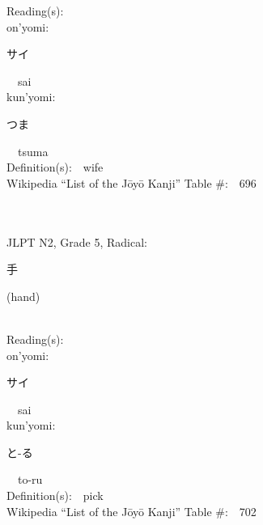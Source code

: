 \begin{multicols}{2}
Reading(s):\ \ \\
{\hspace*{1em}}on'yomi:\ \ \\
{\hspace*{2em}}{\begin{CJK}{UTF8}{min} サイ \end{CJK}}\ \ sai\ \ \\
{\hspace*{1em}}kun'yomi:\ \ \\
{\hspace*{2em}}{\begin{CJK}{UTF8}{min} つま \end{CJK}}\ \ tsuma\ \ \\
Definition(s):\ \ wife \\
Wikipedia ``List of the J\=oy\=o Kanji'' Table \#:\ \ 696 \\
\ \ \\
{\fontsize{34pt}{40pt}  }\ \ \\  %
{JLPT N2, Grade 5, Radical:\ \ {\begin{CJK}{UTF8}{min} 手 \end{CJK}} (hand) } \\
Reading(s):\ \ \\
{\hspace*{1em}}on'yomi:\ \ \\
{\hspace*{2em}}{\begin{CJK}{UTF8}{min} サイ \end{CJK}}\ \ sai\ \ \\
{\hspace*{1em}}kun'yomi:\ \ \\
{\hspace*{2em}}{\begin{CJK}{UTF8}{min} と-る \end{CJK}}\ \ to-ru\ \ \\
Definition(s):\ \ pick \\
Wikipedia ``List of the J\=oy\=o Kanji'' Table \#:\ \ 702 \\
\ \ \\
{\fontsize{34pt}{40pt}  }\ \ \\  %

\end{multicols}
